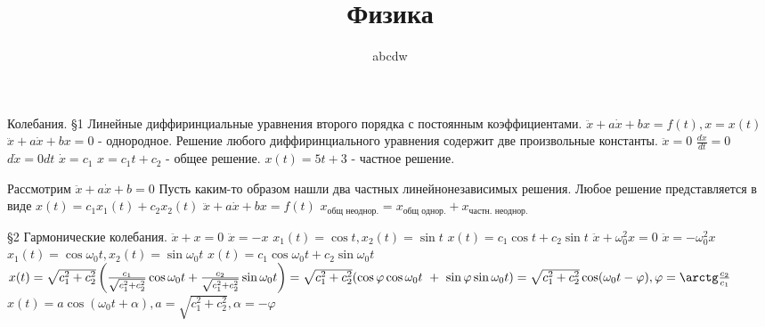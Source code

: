 \documentclass[12pt]{article}
\title{Физика}
\date{}
\author{abcdw}
\begin{document}
    \maketitle
    Колебания.
    \S1 Линейные диффиринциальные уравнения второго порядка с постоянным коэффициентами. \newline
    $\ddot x + a\dot x + bx = f(t), x = x(t)$ \newline
    $\ddot x + a\dot x + bx = 0$ - однородное. \newline
    Решение любого диффиринциального уравнения содержит две произвольные константы. \newline
    $\ddot x = 0$ \newline
    $\frac{d\dot x}{dt} = 0$ \newline
    $d \dot x = 0 dt$ \newline
    $\dot x = c_1$ \newline
    $x = c_1 t + c_2$ - общее решение. \newline
    $x(t) = 5t + 3$ - частное решение. \newline

    Рассмотрим $\ddot x + a\dot x + b = 0$ \newline
    Пусть каким-то образом нашли два частных линейнонезависимых решения. \newline
    Любое решение представляется в виде $x(t) = c_1x_1(t) + c_2x_2(t)$ \newline
    $\ddot x + a\dot x + bx = f(t)$ \newline
    $x_{\mbox{общ неоднор.}} = x_{\mbox{общ однор.}} + x_{\mbox{частн. неоднор.}}$

    \S2 Гармонические колебания. \newline
    $\ddot x + x = 0$ \newline
    $\ddot x = -x$ \newline
    $x_1(t) = \cos t, x_2(t) = \sin t$ \newline
    $x(t) = c_1 \cos t + c_2 \sin t$ \newline
    $\ddot x + \omega_0^2 x = 0$ \newline
    $\ddot x = - \omega_0 ^2 x$ \newline
    $x_1(t) = \cos \omega_0t, x_2(t) = \sin \omega_0t$ \newline
    $x(t) = c_1 \cos \omega_0 t + c_2 \sin \omega_0 t$ \newline
    $x(t) = \sqrt{c_1^2 + c_2 ^2} \left( \frac{c_1}{\sqrt{c_1^2 + c_2 ^2}}\cos \omega_0t + \frac{c_2}{\sqrt{c_1^2 + c_2 ^2}} \sin \omega_0 t \right) = \sqrt{c_1^2 + c_2 ^2} (\cos \varphi \cos \omega_0t~+~\sin \varphi \sin \omega_0t) = \sqrt{c_1^2 + c_2 ^2} \cos (\omega_0t - \varphi), \varphi = \arctg \frac{c_2}{c_1} $ \newline
    $x(t) = a \cos(\omega_0t + \alpha), a = \sqrt{c_1^2 + c_2 ^2}, \alpha = -\varphi$ \newline
\end{document}
